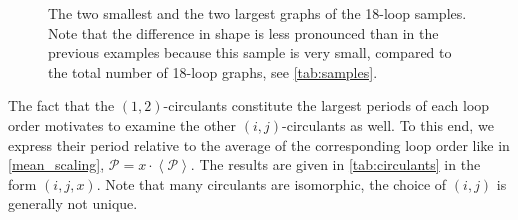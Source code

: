 \documentclass[12pt,a4paper]{article}
\newcommand{\period}{\mathcal P}
\renewcommand{\|}{\rule[-0.4ex]{0.2ex}{1.2em}}
\begin{document}
\begin{figure}[htb]
	\caption{The two smallest and the two largest graphs of the 18-loop samples. Note that the difference in shape is less pronounced than in the previous examples because this sample is very small, compared to the total number of 18-loop graphs, see \cref{tab:samples}.}
	\label{smallest_18}
\end{figure}



The fact that the $(1,2)$-circulants constitute the largest periods of each loop order motivates to examine the other $(i,j)$-circulants as well. To this end, we express their period relative to the average of the corresponding loop order like in \cref{mean_scaling}, $\period = x \cdot \left \langle \period \right \rangle $. The results are given in \cref{tab:circulants} in the form $(i,j,x)$. Note that many circulants are isomorphic, the choice of $(i,j)$ is generally not unique. 
\end{document}
